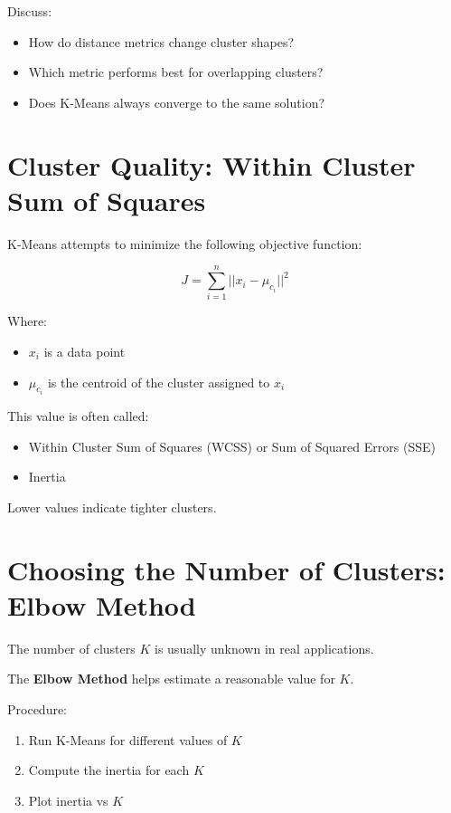 \documentclass[12pt,a4paper]{article}
\begin{document}
Discuss:

\begin{itemize}
\item How do distance metrics change cluster shapes?
\item Which metric performs best for overlapping clusters?
\item Does K-Means always converge to the same solution?
\end{itemize}


\section{Cluster Quality: Within Cluster Sum of Squares}

K-Means attempts to minimize the following objective function:

\[
J = \sum_{i=1}^{n} ||x_i - \mu_{c_i}||^2
\]

Where:

\begin{itemize}
\item $x_i$ is a data point
\item $\mu_{c_i}$ is the centroid of the cluster assigned to $x_i$
\end{itemize}

This value is often called:

\begin{itemize}
\item Within Cluster Sum of Squares (WCSS) or Sum of Squared Errors (SSE) 
\item Inertia
\end{itemize}

Lower values indicate tighter clusters.


\section{Choosing the Number of Clusters: Elbow Method}

The number of clusters $K$ is usually unknown in real applications.

The \textbf{Elbow Method} helps estimate a reasonable value for $K$.

Procedure:

\begin{enumerate}
\item Run K-Means for different values of $K$
\item Compute the inertia for each $K$
\item Plot inertia vs $K$
\end{enumerate}
\end{document}
